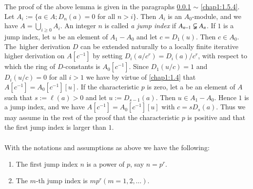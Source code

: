 \subsubsection{}\label{chap1:1.5.1}
The proof of the above lemma is given in the paragraphs \ref{chap1:1.5.1}
$\sim$ \ref{chap1:1.5.4}. Let $A_{i}:=\{a\in A;D_{n}(a)=0$ for all
$n>i\}$. Then $A_{i}$ is an $A_{0}$-module, and we have
$A=\bigcup\limits_{i\geq 0}A_{i}$. An integer $n$ is called {\em a
  jump index} if $A_{n-1} \varsubsetneqq A_{n}$. If $1$ is a jump
index, let $u$ be an element of $A_{1}-A_{0}$ and let
$c=D_{1}(u)$. Then $c\in A_{0}$. The\pageoriginale\ higher derivation
$D$ can be extended naturally to a locally finite iterative higher
derivation on $A[c^{-1}]$ by setting $D_{i}(a/c^{r})=D_{i}(a)/c^{r}$,
with respect to which the ring of $D$-constants is
$A_{0}[c^{-1}]$. Since $D_{1}(u/c)=1$ and $D_{i}(u/c)=0$ for all $i>1$
we have by virtue of \ref{chap1:1.4} that $A[c^{-1}]=A_{0}[c^{-1}][u]$. If
the characteristic $p$ is zero, let a be an element of $A$ such that
$s:=\ell(a)>0$ and let $u:=D_{s-1}(a)$. Then $u\in A_{1}-A_{0}$. Hence
$1$ is a jump index, and we have $A[c^{-1}]=A_{0}[c^{-1}][u]$ with
$c=sD_{s}(a)$. Thus we may assume in the rest of the proof that the
characteristic $p$ is positive and that the first jump index is larger
than $1$.

\subsubsection{}\label{chap1:1.5.2}
\begin{lemma*}
  With the notations and assumptions as above we have the following:
  \begin{enumerate}
    \renewcommand{\labelenumi}{\rm(\theenumi)}
  \item The first jump index $n$ is a power of $p$, say $n=p^{r}$.
    
  \item The $m$-th jump index is $mp^{r}(m=1,2,\ldots)$.
  \end{enumerate}
\end{lemma*}

